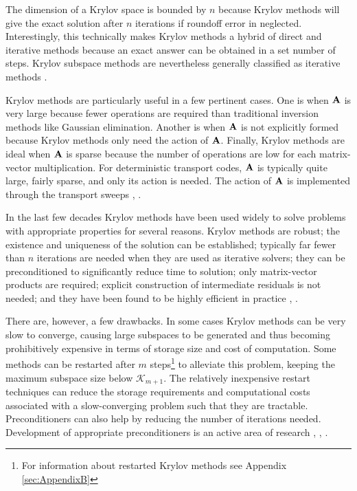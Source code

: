The dimension of a Krylov space is bounded by $n$ because Krylov methods will give the exact solution after $n$ iterations if roundoff error in neglected. Interestingly, this technically makes Krylov methods a hybrid of direct and iterative methods because an exact answer can be obtained in a set number of steps. Krylov subspace methods are nevertheless generally classified as iterative methods \cite{Birkhoff1984}.

Krylov methods are particularly useful in a few pertinent cases. One is when $\mathbf{A}$ is very large because fewer operations are required than traditional inversion methods like Gaussian elimination. Another is when $\mathbf{A}$ is not explicitly formed because Krylov methods only need the action of $\mathbf{A}$. Finally, Krylov methods are ideal when $\mathbf{A}$ is sparse because the number of operations are low for each matrix-vector multiplication. For deterministic transport codes, $\mathbf{A}$ is typically quite large, fairly sparse, and only its action is needed. The action of $\mathbf{A}$ is implemented through the transport sweeps \cite{Lewis1993}, \cite{Ipsen1998}.  

In the last few decades Krylov methods have been used widely to solve problems with appropriate properties for several reasons. Krylov methods are robust; the existence and uniqueness of the solution can be established; typically far fewer than $n$ iterations are needed when they are used as iterative solvers; they can be preconditioned to significantly reduce time to solution; only matrix-vector products are required; explicit construction of intermediate residuals is not needed; and they have been found to be highly efficient in practice \cite{Ipsen1998}, \cite{Knoll2004}. 

There are, however, a few drawbacks. In some cases Krylov methods can be very slow to converge, causing large subspaces to be generated and thus becoming prohibitively expensive in terms of storage size and cost of computation. Some methods can be restarted after $m$ steps\footnote{For information about restarted Krylov methods see Appendix \ref{sec:AppendixB}} to alleviate this problem, keeping the maximum subspace size below $\mathcal{K}_{m+1}$.  The relatively inexpensive restart techniques can reduce the storage requirements and computational costs associated with a slow-converging problem such that they are tractable. Preconditioners can also help by reducing the number of iterations needed. Development of appropriate preconditioners is an active area of research \cite{Warsa2004a}, \cite{Ipsen1998}, \cite{Knoll2004}. 

